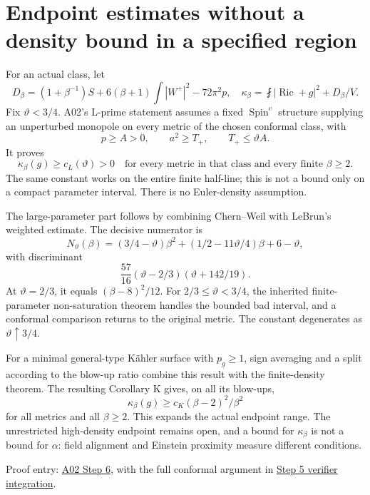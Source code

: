 \documentclass[
]{article}
\begin{document}
\hypertarget{endpoint-estimates-without-a-density-bound-in-a-specified-region}{%
\section{Endpoint estimates without a density bound in a specified
region}\label{endpoint-estimates-without-a-density-bound-in-a-specified-region}}

For an actual class, let \[
 D_\beta=(1+\beta^{-1})S+6(\beta+1)\int|W^+|^2-72\pi^2p,
 \quad
 \kappa_\beta=\fint|\operatorname{Ric}+g|^2+D_\beta/V.
\] Fix \(\vartheta<3/4\). A02's L-prime statement assumes a fixed
\(\operatorname{Spin}^c\) structure supplying an unperturbed monopole on
every metric of the chosen conformal class, with \[
 p\ge A>0,\qquad a^2\ge T_+,\qquad T_+\le\vartheta A.
\] It proves \[
 \kappa_\beta(g)\ge c_L(\vartheta)>0
 \quad\text{for every metric in that class and every finite }\beta\ge2.
\] The same constant works on the entire finite half-line; this is not a
bound only on a compact parameter interval. There is no Euler-density
assumption.

The large-parameter part follows by combining Chern--Weil with LeBrun's
weighted estimate. The decisive numerator is \[
 N_\vartheta(\beta)=
 (3/4-\vartheta)\beta^2+(1/2-11\vartheta/4)\beta+6-\vartheta,
\] with discriminant \[
 \frac{57}{16}(\vartheta-2/3)(\vartheta+142/19).
\] At \(\vartheta=2/3\), it equals \((\beta-8)^2/12\). For
\(2/3\le\vartheta<3/4\), the inherited finite-parameter non-saturation
theorem handles the bounded bad interval, and a conformal comparison
returns to the original metric. The constant degenerates as
\(\vartheta\uparrow3/4\).

For a minimal general-type Kähler surface with \(p_g\ge1\), sign
averaging and a split according to the blow-up ratio combine this result
with the finite-density theorem. The resulting Corollary K gives, on all
its blow-ups, \[
 \kappa_\beta(g)\ge c_K(\beta-2)^2/\beta^2
\] for all metrics and all \(\beta\ge2\). This expands the actual
endpoint range. The unrestricted high-density endpoint remains open, and
a bound for \(\kappa_\beta\) is not a bound for \(\alpha\): field
alignment and Einstein proximity measure different conditions.

Proof entry:
\href{sources/Sessions/S1003A02/workspace/notes/step6_theorems_and_O11_rotation.md}{A02
Step 6}, with the full conformal argument in
\href{sources/Sessions/S1003A02/trace/ttcs/results/step5_ttcs01_verifier1_integration.md}{Step
5 verifier integration}.
\end{document}
